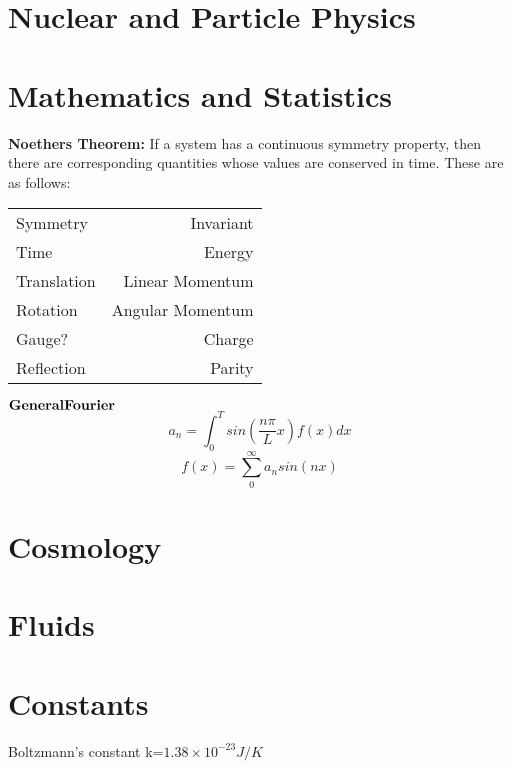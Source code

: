 \documentclass{article}
\begin{document}
\section{Nuclear and Particle Physics}









\section{Mathematics and Statistics}
{\bf Noethers Theorem:} If a system has a continuous symmetry property, then there are corresponding quantities whose values are conserved in time.  These are as follows:

\begin{tabular}{ l | r}
  Symmetry & Invariant\\
  Time & Energy\\
  Translation & Linear Momentum\\
  Rotation & Angular Momentum\\
  Gauge? & Charge\\
  Reflection & Parity\\
\end{tabular}

${\bf General Fourier}$ \begin{equation}a_n=\int_0^T sin(\frac{n\pi}{L}x)f(x)dx\end{equation}
\begin{equation}f(x)=\sum_0^{\infty} a_n sin(n x)\end{equation}




\section{Cosmology}









\section{Fluids}









\section{Constants}
Boltzmann's constant k=$1.38\times10^{-23} J/K$
\end{document}
